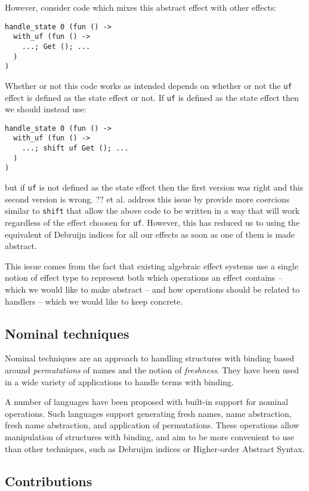 \documentclass{article}
\newcommand{\code}[2][ocaml]{\lstinline[style={#1}]{#2}}
\begin{document}
However, consider code which mixes this abstract effect with other
effects:
\begin{lstlisting}
handle_state 0 (fun () ->
  with_uf (fun () ->
    ...; Get (); ...
  )
)
\end{lstlisting}
Whether or not this code works as intended depends on whether or not the
\code{uf} effect is defined as the state effect or not. If \code{uf}
is defined as the state effect then we should instead use:
\begin{lstlisting}
handle_state 0 (fun () ->
  with_uf (fun () ->
    ...; shift uf Get (); ...
  )
)
\end{lstlisting}
but if \code{uf} is not defined as the state effect then the first
version was right and this second version is wrong. ?? et al. address
this issue by provide more coercions similar to \code{shift} that allow
the above code to be written in a way that will work regardless of the
effect choosen for \code{uf}. However, this has reduced us to using the
equivalent of Debruijn indices for all our effects as soon as one of
them is made abstract.

This issue comes from the fact that existing algebraic effect systems
use a single notion of effect type to represent both which operations an
effect contains -- which we would like to make abstract -- and how
operations should be related to handlers -- which we would like to keep
concrete.

\subsection{Nominal techniques}

Nominal techniques\cite{??} are an approach to handling structures with
binding based around \emph{permutations} of names and the notion of
\emph{freshness}. They have been used in a wide variety of
applications\cite{??} to handle terms with binding.

A number of languages have been proposed with built-in support for
nominal operations\cite{??}. Such languages support generating fresh
names, name abstraction, fresh name abstraction, and application of
permutations. These operations allow manipulation of structures with
binding, and aim to be more convenient to use than other techniques,
such as Debruijm indices or Higher-order Abstract Syntax.

\subsection{Contributions}
\end{document}
